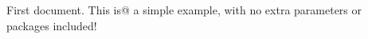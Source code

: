 \documentclass{article}
\begin{document}
First document. This is@ a simple example, with no 
extra parameters or packages included!
\end{document}
